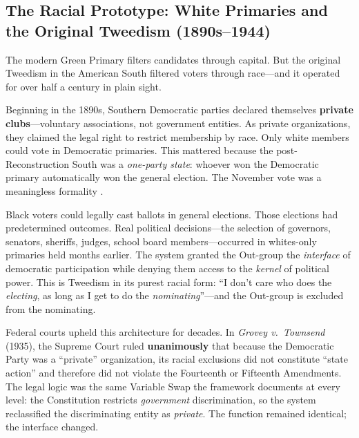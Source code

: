 \subsection{The Racial Prototype: White Primaries and the Original Tweedism (1890s--1944)}

The modern Green Primary filters candidates through capital. But the original Tweedism in the American South filtered voters through race---and it operated for over half a century in plain sight.

Beginning in the 1890s, Southern Democratic parties declared themselves \textbf{private clubs}---voluntary associations, not government entities. As private organizations, they claimed the legal right to restrict membership by race. Only white members could vote in Democratic primaries. This mattered because the post-Reconstruction South was a \textit{one-party state}: whoever won the Democratic primary automatically won the general election. The November vote was a meaningless formality \cite{smith_v_allwright, keysack_white}.

Black voters could legally cast ballots in general elections. Those elections had predetermined outcomes. Real political decisions---the selection of governors, senators, sheriffs, judges, school board members---occurred in whites-only primaries held months earlier. The system granted the Out-group the \textit{interface} of democratic participation while denying them access to the \textit{kernel} of political power. This is Tweedism in its purest racial form: ``I don't care who does the \textit{electing}, as long as I get to do the \textit{nominating}''---and the Out-group is excluded from the nominating.

Federal courts upheld this architecture for decades. In \textit{Grovey v.\ Townsend} (1935), the Supreme Court ruled \textbf{unanimously} that because the Democratic Party was a ``private'' organization, its racial exclusions did not constitute ``state action'' and therefore did not violate the Fourteenth or Fifteenth Amendments. The legal logic was the same Variable Swap the framework documents at every level: the Constitution restricts \textit{government} discrimination, so the system reclassified the discriminating entity as \textit{private}. The function remained identical; the interface changed.

